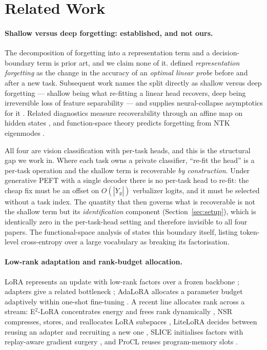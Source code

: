\section{Related Work}
\label{sec:related}

\paragraph{Shallow versus deep forgetting: established, and not ours.}
The decomposition of forgetting into a representation term and a decision-boundary
term is prior art, and we claim none of it. \citet{davari2022probing} defined
\emph{representation forgetting} as the change in the accuracy of an
\emph{optimal linear probe} before and after a new task. Subsequent work names the
split directly as shallow versus deep forgetting --- shallow being what re-fitting
a linear head recovers, deep being irreversible loss of feature separability ---
and supplies neural-collapse asymptotics for it
\citep{headscollapse2025}. Related diagnostics measure recoverability through an
affine map on hidden states \citep{lostorhidden2026}, and function-space theory
predicts forgetting from NTK eigenmodes \citep{functionspace2026}.

All four are vision classification with per-task heads, and this is the structural
gap we work in. Where each task owns a private classifier, ``re-fit the head'' is
a per-task operation and the shallow term is recoverable \emph{by construction}.
Under generative PEFT with a single decoder there is no per-task head to re-fit:
the cheap fix must be an offset on $O(|Y_g|)$ verbalizer logits, and it must be
selected without a task index. The quantity that then governs what is recoverable
is not the shallow term but its \emph{identification} component
(Section~\ref{sec:setup}), which is identically zero in the per-task-head setting
and therefore invisible to all four papers. The functional-space analysis of
\citet{functionspace2026} states this boundary itself, listing token-level
cross-entropy over a large vocabulary as breaking its factorisation.

\paragraph{Low-rank adaptation and rank-budget allocation.}
LoRA represents an update with low-rank factors over a frozen backbone
\citep{hu2022lora}; adapters give a related bottleneck \citep{houlsby2019adapter};
AdaLoRA allocates a parameter budget adaptively within one-shot fine-tuning
\citep{zhang2023adalora}. A recent line allocates rank across a stream: E$^2$-LoRA
concentrates energy and frees rank dynamically \citep{li2026e2lora}, NSR
compresses, stores, and reallocates LoRA subspaces \citep{yoon2026nsr}, LiteLoRA
decides between reusing an adapter and recruiting a new one
\citep{dieudonne2026litelora}, SLICE initialises factors with replay-aware
gradient surgery \citep{pasquali2026slice}, and ProCL reuses program-memory slots
\citep{le2026procl}.

